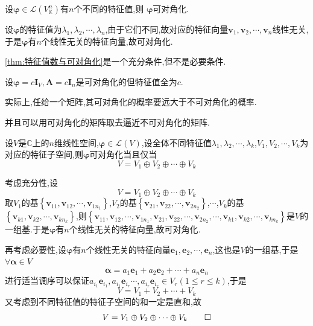 \begin{formal}
\begin{theorem}[特征值数与可对角化]\label{thm:特征值数与可对角化}
    设$\bm{\varphi}\in \mathcal{L}\left(
        V_{\mathbb{K}}^n
    \right)$有$n$个不同的特征值,则
    $\bm{\varphi}$可对角化.
\end{theorem}
\begin{Proof}
设$\bm{\varphi}$的特征值为$\lambda_1,\lambda_2,\cdots,\lambda_n$,由于它们不同,故对应的特征向量$\bm{v}_1,\bm{v}_2,\cdots,\bm{v}_n$线性无关,于是$\bm{\varphi}$有$n$个线性无关的特征向量,故可对角化.
\end{Proof}
\end{formal}
\begin{red}
\begin{remark}
    \cref{thm:特征值数与可对角化}是一个充分条件,但不是必要条件.
\end{remark}
\end{red}
\begin{brown}
\begin{example}
    设$\bm{\varphi}=c\bm{I}_V,\bm{A}=c\bm{I}_n$是可对角化的但特征值全为$c$.
\end{example}
\end{brown}
\begin{red}
\begin{remark}
    实际上,任给一个矩阵,其可对角化的概率要远大于不可对角化的概率.

    并且可以用可对角化的矩阵取去逼近不可对角化的矩阵.
\end{remark}
\end{red}
\begin{formal}
\begin{theorem}[可对角化的条件]\label{thm:可对角化的条件}
    设$V$是$\mathbb{C}$上的$n$维线性空间,$
     \bm{\varphi}\in \mathcal{L}\left(
        V
    \right)
    $,设全体不同特征值$\lambda_1,\lambda_2,\cdots,\lambda_k$,$V_1,V_2,\cdots,V_k$为
    对应的特征子空间,则$\bm{\varphi}$可对角化当且仅当
    \[
    V=V_1\oplus V_2\oplus\cdots\oplus V_k
    \]
\end{theorem}
\begin{Proof}
考虑充分性,设
\[
V=V_1\oplus V_2\oplus\cdots\oplus V_k
\]取$V_1$的基$\left\{
    \bm{v}_{11},\bm{v}_{12},\cdots,\bm{v}_{1n_1}
\right\}$,$V_2$的基$\left\{
    \bm{v}_{21},\bm{v}_{22},\cdots,\bm{v}_{2n_2}
\right\}$,$\cdots$,$V_k$的基$\left\{
    \bm{v}_{k1},\bm{v}_{k2},\cdots,\bm{v}_{kn_k}
\right\}$,则$
\left\{
    \bm{v}_{11},\bm{v}_{12},\cdots,\bm{v}_{1n_1},\bm{v}_{21},\bm{v}_{22},\cdots,\bm{v}_{2n_2},\cdots,\bm{v}_{k1},\bm{v}_{k2},\cdots,\bm{v}_{kn_k}
\right\}
$是$V$的一组基.于是$\bm{\varphi}$有$n$个线性无关的特征向量,故可对角化.

再考虑必要性,设$\bm{\varphi}$有$n$个线性无关的特征向量$\bm{e}_1,\bm{e}_2,\cdots,\bm{e}_n$,这也是$V$的一组基,于是$\forall \bm{\alpha}\in V$
\[
\bm{\alpha}=a_1\bm{e}_1 + a_2\bm{e}_2+\cdots+a_n\bm{e}_n
\]
进行适当调序可以保证$a_{i_1}\bm{e}_{i_1},a_{i_1}\bm{e}_{i_r}\cdots,a_{i_r}\bm{e}_{i_r}\in V_r\left(
    1   \leqslant r\leqslant k
\right)$,于是
\[
V=V_1+ V_2+\cdots+V_k
\]又考虑到不同特征值的特征子空间的和一定是直和,故
\[
V=V_1\oplus V_2\oplus\cdots\oplus V_k
\qedhere
\]
\end{Proof}
\end{formal}
